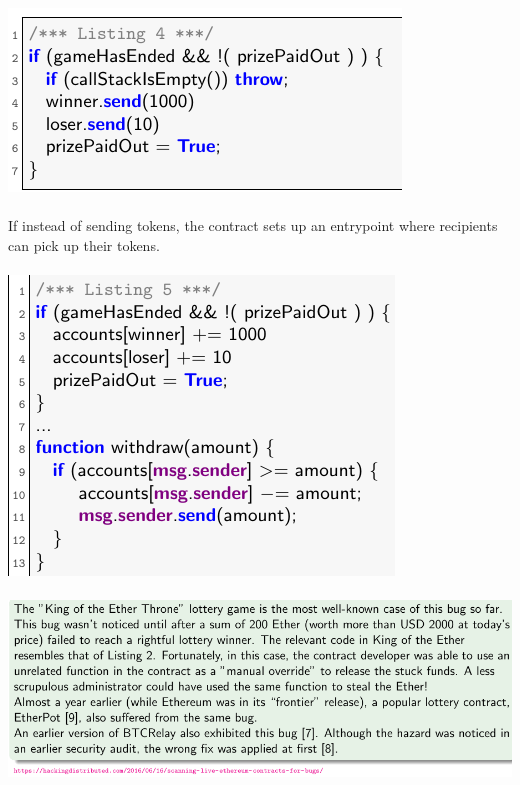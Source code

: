 \documentclass{article}
\begin{document}
\includegraphics[scale=0.3]{94.png}\\\\
If instead of sending tokens, the contract sets up an entrypoint where recipients can pick up their tokens.\\\\
\includegraphics[scale=0.3]{95.png}\\\\
\includegraphics[scale=0.3]{96.png}\\
\end{document}

